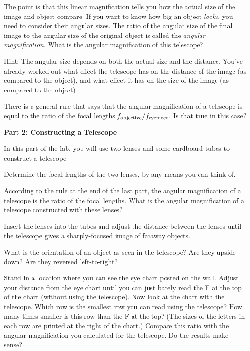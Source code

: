 The point is that this linear magnification tells you how the
actual size of the image and object compare.  If you want to know
how big an object {\it looks}, you need to consider their
angular sizes.  The ratio of the angular size of the
final image to the angular size of the original object
is called the {\it angular magnification}.
What is the angular magnification of this telescope?

Hint: The angular size depends on both the actual size and the
distance.  You've already worked out what effect the telescope has on
the distance of the image (as compared to the object), and what effect
it has on the size of the image (as compared to the object).


\answerspace{1.5in}

There is a general rule that says that the angular magnification
of a telescope is equal to the ratio of the focal lengths $f_{\rm objective}/
f_{\rm eyepiece}$.  Is that true in this case?

\answerspace{1in}

{\bf Part 2: Constructing a Telescope}

In this part of the lab, you will use two lenses and some cardboard tubes
to construct a telescope.  

Determine the focal lengths of the two lenses, by any means you 
can think of.

\answerspace{1in}

According to the rule at the end of the last part, the angular
magnification of a telescope is the ratio of the focal lengths.
What is the angular magnification of a telescope constructed with
these lenses?

\answerspace{1in}

Insert the lenses into the tubes and adjust the distance between the lenses
until the telescope gives a sharply-focused image of faraway objects.

What is the orientation of an object as seen in the telescope?  Are
they upside-down?  Are they reversed left-to-right?

\answerspace{1in}

Stand in a location where you can see the eye chart posted on the wall.
Adjust your distance from the eye chart until you can just barely
read the F at the top of the chart (without using the telescope).
Now look at the chart with the telescope.  Which row is the
smallest row you can read using the telescope?  How many times
smaller is this row than the F at the top?  (The sizes of the letters
in each row are printed at the right of the chart.)
Compare this ratio with the angular magnification you calculated
for the telescope.  Do the results make sense?



